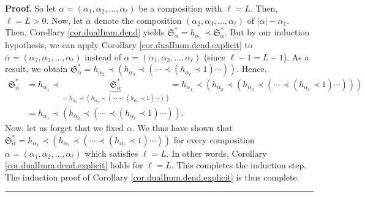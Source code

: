 \documentclass[numbers=enddot,12pt,final,onecolumn,notitlepage,abstracton]{scrartcl}%
\theoremstyle{definition}
\newenvironment{proof}[1][Proof]{\noindent\textbf{#1.} }{\ \rule{0.5em}{0.5em}}
\newenvironment{verlong}{}{}
\begin{document}
\begin{verlong}
\begin{proof}
So let $\alpha=\left(  \alpha_{1},\alpha_{2},\ldots,\alpha_{\ell}\right)  $ be
a composition with $\ell=L$. Then, $\ell=L>0$. Now, let $\overline{\alpha}$
denote the composition $\left(  \alpha_{2},\alpha_{3},\ldots,\alpha_{\ell
}\right)  $ of $\left\vert \alpha\right\vert -\alpha_{1}$. Then, Corollary
\ref{cor.dualImm.dend} yields $\mathfrak{S}_{\alpha}^{\ast}=h_{\alpha_{1}%
}\left.  \prec\right.  \mathfrak{S}_{\overline{\alpha}}^{\ast}$. But by our
induction hypothesis, we can apply Corollary \ref{cor.dualImm.dend.explicit}
to $\overline{\alpha}=\left(  \alpha_{2},\alpha_{3},\ldots,\alpha_{\ell
}\right)  $ instead of $\alpha=\left(  \alpha_{1},\alpha_{2},\ldots
,\alpha_{\ell}\right)  $ (since $\ell-1=L-1$). As a result, we obtain
$\mathfrak{S}_{\overline{\alpha}}^{\ast}=h_{\alpha_{2}}\left.  \prec\right.
\left(  h_{\alpha_{3}}\left.  \prec\right.  \left(  \cdots\left.
\prec\right.  \left(  h_{\alpha_{\ell}}\left.  \prec\right.  1\right)
\cdots\right)  \right)  $. Hence,%
\begin{align*}
\mathfrak{S}_{\alpha}^{\ast}  &  =h_{\alpha_{1}}\left.  \prec\right.
\underbrace{\mathfrak{S}_{\overline{\alpha}}^{\ast}}_{=h_{\alpha_{2}}\left.
\prec\right.  \left(  h_{\alpha_{3}}\left.  \prec\right.  \left(
\cdots\left.  \prec\right.  \left(  h_{\alpha_{\ell}}\left.  \prec\right.
1\right)  \cdots\right)  \right)  }=h_{\alpha_{1}}\left.  \prec\right.
\left(  h_{\alpha_{2}}\left.  \prec\right.  \left(  h_{\alpha_{3}}\left.
\prec\right.  \left(  \cdots\left.  \prec\right.  \left(  h_{\alpha_{\ell}%
}\left.  \prec\right.  1\right)  \cdots\right)  \right)  \right) \\
&  =h_{\alpha_{1}}\left.  \prec\right.  \left(  h_{\alpha_{2}}\left.
\prec\right.  \left(  \cdots\left.  \prec\right.  \left(  h_{\alpha_{\ell}%
}\left.  \prec\right.  1\right)  \cdots\right)  \right)  .
\end{align*}
Now, let us forget that we fixed $\alpha$. We thus have shown that
\newline$\mathfrak{S}_{\alpha}^{\ast}=h_{\alpha_{1}}\left.  \prec\right.
\left(  h_{\alpha_{2}}\left.  \prec\right.  \left(  \cdots\left.
\prec\right.  \left(  h_{\alpha_{\ell}}\left.  \prec\right.  1\right)
\cdots\right)  \right)  $ for every composition $\alpha=\left(  \alpha
_{1},\alpha_{2},\ldots,\alpha_{\ell}\right)  $ which satisfies $\ell=L$. In
other words, Corollary \ref{cor.dualImm.dend.explicit} holds for $\ell=L$.
This completes the induction step. The induction proof of Corollary
\ref{cor.dualImm.dend.explicit} is thus complete.
\end{proof}
\end{verlong}
\end{document}

